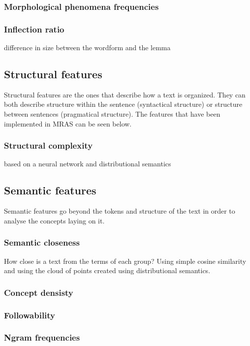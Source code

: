 \documentclass{bsu-ms}
\newcommand{\projectName}{MRAS\xspace}
\begin{document}
\subsubsection*{Morphological phenomena frequencies}

\subsubsection*{Inflection ratio}
difference in size between the wordform and the lemma


\subsection{Structural features}
Structural features are the ones that describe how a text is organized. They can both describe structure within the sentence (syntactical structure) or structure between sentences (pragmatical structure). The features that have been implemented in \projectName can be seen below.


\subsubsection*{Structural complexity}
based on a neural network and distributional semantics

\subsection{Semantic features}
Semantic features go beyond the tokens and structure of the text in order to analyse the concepts laying on it.

\subsubsection*{Semantic closeness}
How close is a text from the terms of each group?
Using simple cosine similarity and using the cloud of points created using distributional semantics.
\subsubsection*{Concept densisty}
\subsubsection*{Followability}
\subsubsection*{Ngram frequencies}
\end{document}
